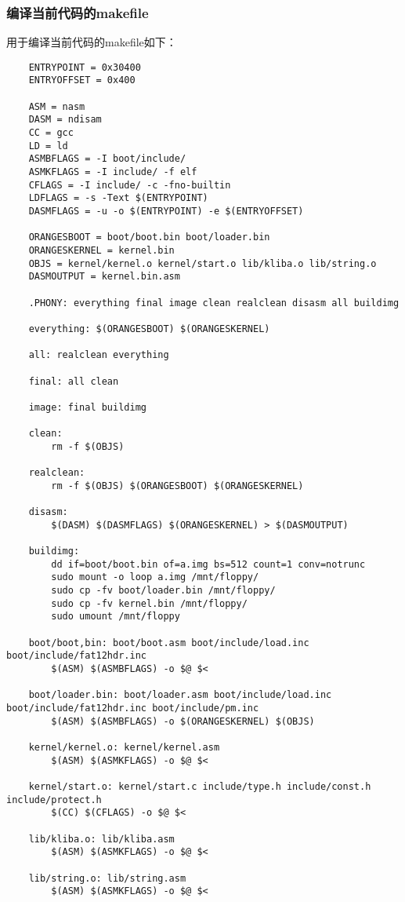 \documentclass[a4paper,left=2.5cm,right=2.5cm,11pt]{article}
\begin{document}
\subsubsection{编译当前代码的makefile}
	用于编译当前代码的makefile如下：
	\begin{lstlisting}
	ENTRYPOINT = 0x30400
	ENTRYOFFSET = 0x400

	ASM = nasm
	DASM = ndisam
	CC = gcc
	LD = ld
	ASMBFLAGS = -I boot/include/
	ASMKFLAGS = -I include/ -f elf
	CFLAGS = -I include/ -c -fno-builtin
	LDFLAGS = -s -Text $(ENTRYPOINT)
	DASMFLAGS = -u -o $(ENTRYPOINT) -e $(ENTRYOFFSET)

	ORANGESBOOT = boot/boot.bin boot/loader.bin
	ORANGESKERNEL = kernel.bin
	OBJS = kernel/kernel.o kernel/start.o lib/kliba.o lib/string.o
	DASMOUTPUT = kernel.bin.asm

	.PHONY: everything final image clean realclean disasm all buildimg

	everything: $(ORANGESBOOT) $(ORANGESKERNEL)
	
	all: realclean everything

	final: all clean

	image: final buildimg

	clean:
		rm -f $(OBJS)

	realclean:
		rm -f $(OBJS) $(ORANGESBOOT) $(ORANGESKERNEL)

	disasm:
		$(DASM) $(DASMFLAGS) $(ORANGESKERNEL) > $(DASMOUTPUT)

	buildimg:
		dd if=boot/boot.bin of=a.img bs=512 count=1 conv=notrunc
		sudo mount -o loop a.img /mnt/floppy/
		sudo cp -fv boot/loader.bin /mnt/floppy/
		sudo cp -fv kernel.bin /mnt/floppy/
		sudo umount /mnt/floppy

	boot/boot,bin: boot/boot.asm boot/include/load.inc boot/include/fat12hdr.inc
		$(ASM) $(ASMBFLAGS) -o $@ $<

	boot/loader.bin: boot/loader.asm boot/include/load.inc boot/include/fat12hdr.inc boot/include/pm.inc
		$(ASM) $(ASMBFLAGS) -o $(ORANGESKERNEL) $(OBJS)

	kernel/kernel.o: kernel/kernel.asm
		$(ASM) $(ASMKFLAGS) -o $@ $<

	kernel/start.o: kernel/start.c include/type.h include/const.h include/protect.h
		$(CC) $(CFLAGS) -o $@ $<
	
	lib/kliba.o: lib/kliba.asm
		$(ASM) $(ASMKFLAGS) -o $@ $<

	lib/string.o: lib/string.asm
		$(ASM) $(ASMKFLAGS) -o $@ $<
	\end{lstlisting}
\end{document}
